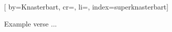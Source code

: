
[%
    by={Knasterbart},
    cr={},
    li={},
    index={superknasterbart}]


    \label{superknasterbart}

    \beginverse
        Example verse ...
    \endverse
\endsong
